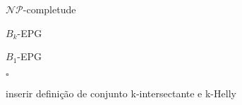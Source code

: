 $\mathcal{NP}$-completude

$B_k$-EPG

$B_1$-EPG

 $\square$
 
inserir definição de conjunto k-intersectante e k-Helly

